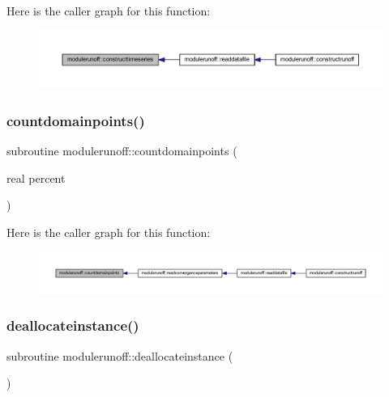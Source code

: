 Here is the caller graph for this function\+:
\nopagebreak
\begin{figure}[H]
\begin{center}
\leavevmode
\includegraphics[width=350pt]{namespacemodulerunoff_a38585735a1deed54aec387488350fd0d_icgraph}
\end{center}
\end{figure}
\mbox{\label{namespacemodulerunoff_a6dee0b7b0f34390926e9ca24de451565}} 
\subsubsection{\texorpdfstring{countdomainpoints()}{countdomainpoints()}}
{\footnotesize\ttfamily subroutine modulerunoff\+::countdomainpoints (\begin{DoxyParamCaption}\item[{real}]{percent }\end{DoxyParamCaption})\hspace{0.3cm}{\ttfamily [private]}}

Here is the caller graph for this function\+:
\nopagebreak
\begin{figure}[H]
\begin{center}
\leavevmode
\includegraphics[width=350pt]{namespacemodulerunoff_a6dee0b7b0f34390926e9ca24de451565_icgraph}
\end{center}
\end{figure}
\mbox{\label{namespacemodulerunoff_ad9192dfb595b8f16119a042aa13d95c4}} 
\subsubsection{\texorpdfstring{deallocateinstance()}{deallocateinstance()}}
{\footnotesize\ttfamily subroutine modulerunoff\+::deallocateinstance (\begin{DoxyParamCaption}{ }\end{DoxyParamCaption})\hspace{0.3cm}{\ttfamily [private]}}

